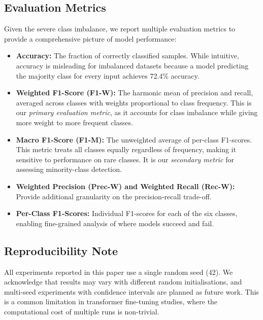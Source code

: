 \documentclass[12pt, a4paper]{article}
\begin{document}
\subsection{Evaluation Metrics}

Given the severe class imbalance, we report multiple evaluation metrics to provide a comprehensive picture of model performance:

\begin{itemize}[leftmargin=2em]
    \item \textbf{Accuracy:} The fraction of correctly classified samples. While intuitive, accuracy is misleading for imbalanced datasets because a model predicting the majority class for every input achieves 72.4\% accuracy.
    
    \item \textbf{Weighted F1-Score (F1-W):} The harmonic mean of precision and recall, averaged across classes with weights proportional to class frequency. This is our \textit{primary evaluation metric}, as it accounts for class imbalance while giving more weight to more frequent classes.
    
    \item \textbf{Macro F1-Score (F1-M):} The unweighted average of per-class F1-scores. This metric treats all classes equally regardless of frequency, making it sensitive to performance on rare classes. It is our \textit{secondary metric} for assessing minority-class detection.
    
    \item \textbf{Weighted Precision (Prec-W) and Weighted Recall (Rec-W):} Provide additional granularity on the precision-recall trade-off.
    
    \item \textbf{Per-Class F1-Scores:} Individual F1-scores for each of the six classes, enabling fine-grained analysis of where models succeed and fail.
\end{itemize}

\subsection{Reproducibility Note}

All experiments reported in this paper use a single random seed (42). We acknowledge that results may vary with different random initialisations, and multi-seed experiments with confidence intervals are planned as future work. This is a common limitation in transformer fine-tuning studies, where the computational cost of multiple runs is non-trivial.
\end{document}
